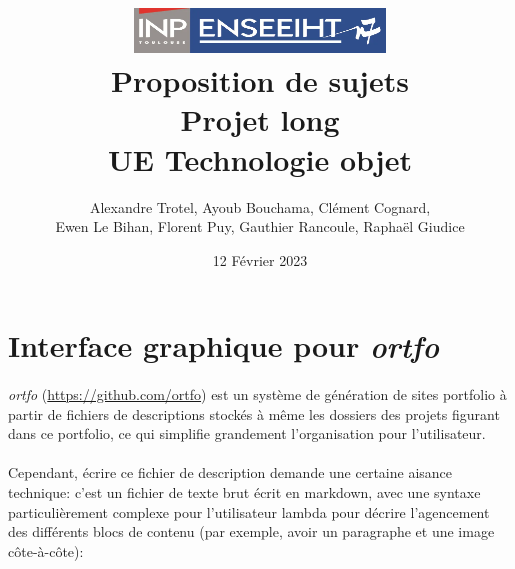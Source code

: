 \documentclass{article}
\begin{document}
    \title{
        \includegraphics[width=0.5\textwidth]{logo-enseeiht.png}
        \\[3cm]
        Proposition de sujets \\
        Projet long \\
        UE Technologie objet
    }

    \author{Alexandre Trotel, Ayoub Bouchama, Clément Cognard, \\
    Ewen Le Bihan, Florent Puy, Gauthier Rancoule, Raphaël Giudice}
    \date{12 Février 2023}

    \maketitle
    \tableofcontents

    \newpage

    \section{Interface graphique pour \emph{ortfo} }
    \paragraph{}
    
    \emph{ortfo}  (\url{https://github.com/ortfo}) est un système de génération de sites portfolio à partir de
fichiers de descriptions stockés à même les dossiers des projets figurant dans ce portfolio, ce qui
simplifie grandement l’organisation pour l’utilisateur.

\paragraph{}

Cependant, écrire ce fichier de description demande une certaine aisance technique: c’est
un fichier de texte brut écrit en markdown, avec une syntaxe particulièrement complexe pour
l’utilisateur lambda pour décrire l’agencement des différents blocs de contenu (par exemple, avoir
un paragraphe et une image côte-à-côte):
\end{document}
